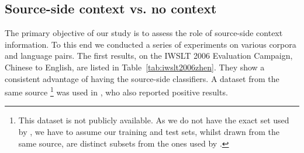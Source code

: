 \documentclass[smallextended]{svjour3}       %
\theoremstyle{break}
\begin{document}
\subsection{Source-side context vs. no context}
\label{sec:results1}

The primary objective of our study is to assess the role of
source-side context information. To this end we conducted a series of
experiments on various corpora and language pairs. The first results,
on the IWSLT 2006 Evaluation Campaign, Chinese to English, are listed
in Table~\ref{tab:iwslt2006zhen}. They show a consistent advantage of
having the source-side classifiers. A dataset from the same source
\footnote{This dataset is not publicly available. As we do not have the exact set used by
  \cite{Stroppa+07}, we have to assume our training and test sets,
  whilst drawn from the same source, are distinct subsets from the
  ones used by \cite{Stroppa+07}.} was used in \cite{Stroppa+07}, who
also reported positive results.
\end{document}

